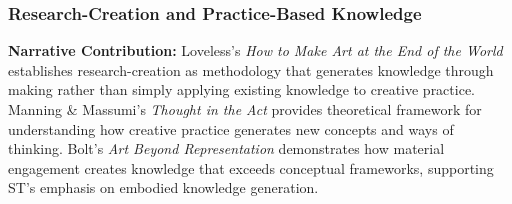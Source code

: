 \subsubsection{Research-Creation and Practice-Based Knowledge}

\textbf{Narrative Contribution:} Loveless's \textit{How to Make Art at the End of the World} establishes research-creation as methodology that generates knowledge through making rather than simply applying existing knowledge to creative practice. Manning \& Massumi's \textit{Thought in the Act} provides theoretical framework for understanding how creative practice generates new concepts and ways of thinking. Bolt's \textit{Art Beyond Representation} demonstrates how material engagement creates knowledge that exceeds conceptual frameworks, supporting ST's emphasis on embodied knowledge generation.